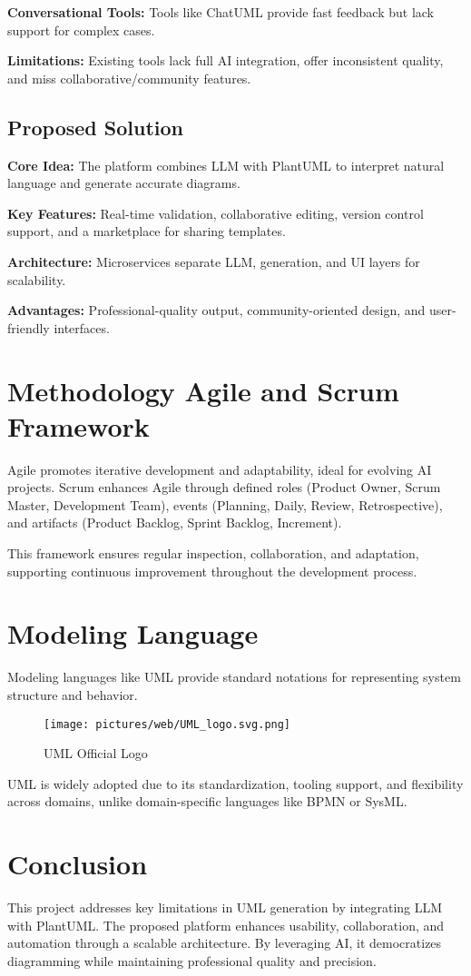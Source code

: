 \textbf{Conversational Tools:} Tools like ChatUML provide fast feedback but lack support for complex cases.

\textbf{Limitations:} Existing tools lack full AI integration, offer inconsistent quality, and miss collaborative/community features.

\subsection{Proposed Solution}

\textbf{Core Idea:} The platform combines LLM with PlantUML to interpret natural language and generate accurate diagrams.

\textbf{Key Features:} Real-time validation, collaborative editing, version control support, and a marketplace for sharing templates.

\textbf{Architecture:} Microservices separate LLM, generation, and UI layers for scalability.

\textbf{Advantages:} Professional-quality output, community-oriented design, and user-friendly interfaces.


\section{Methodology Agile and Scrum Framework}

Agile promotes iterative development and adaptability, ideal for evolving AI projects. Scrum enhances Agile through defined roles (Product Owner, Scrum Master, Development Team), events (Planning, Daily, Review, Retrospective), and artifacts (Product Backlog, Sprint Backlog, Increment).

This framework ensures regular inspection, collaboration, and adaptation, supporting continuous improvement throughout the development process.

\section{Modeling Language}

Modeling languages like UML provide standard notations for representing system structure and behavior.

\begin{figure}[htbp]
\centering
\texttt{[image: pictures/web/UML\_logo.svg.png]}
\caption{UML Official Logo}
\label{fig:uml_logo}
\end{figure}

UML is widely adopted due to its standardization, tooling support, and flexibility across domains, unlike domain-specific languages like BPMN or SysML.

\section{Conclusion}
This project addresses key limitations in UML generation by integrating LLM with PlantUML.
The proposed platform enhances usability, collaboration, and automation through a scalable architecture.
By leveraging AI, it democratizes diagramming while maintaining professional quality and precision.

